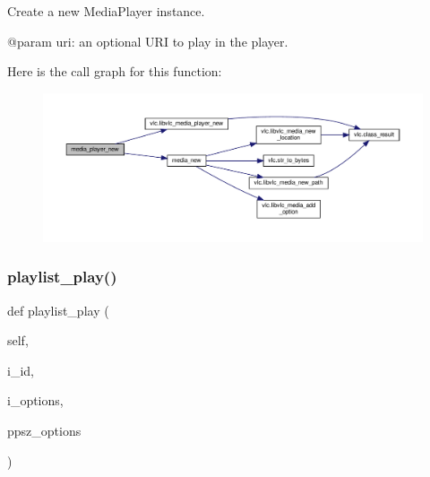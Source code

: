 \begin{DoxyVerb}Create a new MediaPlayer instance.

@param uri: an optional URI to play in the player.
\end{DoxyVerb}
 Here is the call graph for this function\+:
\nopagebreak
\begin{figure}[H]
\begin{center}
\leavevmode
\includegraphics[width=350pt]{classvlc_1_1_instance_a356a94c765e690cec25514e36101c6d7_cgraph}
\end{center}
\end{figure}
\mbox{\label{classvlc_1_1_instance_a411dd250dfc733b33edb8fb676e51ad4}} 
\subsubsection{\texorpdfstring{playlist\+\_\+play()}{playlist\_play()}}
{\footnotesize\ttfamily def playlist\+\_\+play (\begin{DoxyParamCaption}\item[{}]{self,  }\item[{}]{i\+\_\+id,  }\item[{}]{i\+\_\+options,  }\item[{}]{ppsz\+\_\+options }\end{DoxyParamCaption})}


